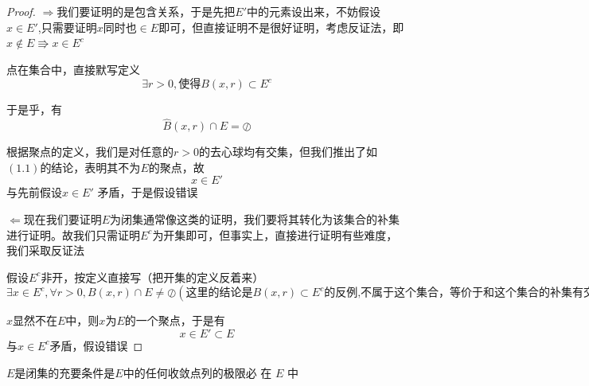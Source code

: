 \documentclass[lang=cn,10pt]{elegantbook}
\begin{document}
\begin{proof}
	
	$\Longrightarrow $我们要证明的是包含关系，于是先把$E'$中的元素设出来，不妨假设$x\in E'$,只需要证明$x\text{同时也}\in E$即可，但直接证明不是很好证明，考虑反证法，即$x\notin E\Rrightarrow x\in E^c$
	
	点在集合中，直接默写定义
	\begin{equation*}
		\exists r>0,\text{使得}  B(x,r)\subset E^c
	\end{equation*}
	
	于是乎，有
	\begin{equation}
		\hat{B}\left( x,r \right) \cap E=\oslash 
	\end{equation}
	
	根据聚点的定义，我们是对任意的$r>0$的去心球均有交集，但我们推出了如$(1.1)$的结论，表明其不为$E$的聚点，故
	\begin{equation*}
		x\in E'
	\end{equation*}
	与先前假设$x\in  E'$ 矛盾，于是假设错误
	
	$\Longleftarrow$现在我们要证明$E$为闭集通常像这类的证明，我们要将其转化为该集合的补集进行证明。故我们只需证明$E^{c}$为开集即可，但事实上，直接进行证明有些难度，我们采取反证法
	
	假设$E^{c}$非开，按定义直接写（把开集的定义反着来）
	\begin{equation*}
		\exists x \in E^{c},\forall r >0,B(x,r)\cap E\ne\oslash (\text{这里的结论是}B(x,r)\subset E^{c}\text{的反例,不属于这个集合，等价于和这个集合的补集有交集})
	\end{equation*}
	
	$x$显然不在$E$中，则$x$为$E$的一个聚点，于是有
	\begin{equation*}		
		x\in E' \subset E
	\end{equation*}
	与$x \in E^{c}$矛盾，假设错误
\end{proof}
\begin{corollary}
	$E $是闭集的充要条件是$ E $中的任何收敛点列的极限必
	在 $E$ 中
\end{corollary}
\end{document}
